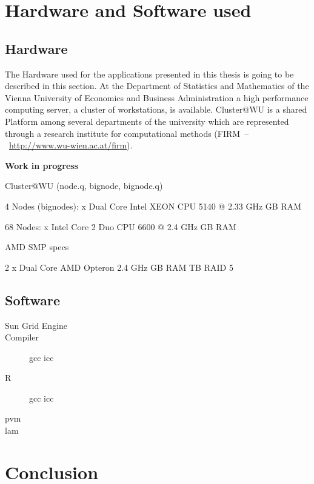 \section{Hardware and Software used}

\subsection{Hardware}
The Hardware used for the applications presented in this thesis is
going to be described in this section.
At the Department of Statistics and Mathematics of the Vienna
University of Economics and Business Administration a high performance
computing server, a cluster of workstations, is
available. Cluster@WU is a shared Platform among several departments
of the university which are represented through a research institute
for computational methods (FIRM~--~\url{http://www.wu-wien.ac.at/firm}). 

\textbf{Work in progress }


Cluster@WU (node.q, bignode, bignode.q)\newline

4 Nodes (bignodes): x Dual Core Intel XEON CPU 5140 @ 2.33 GHz GB RAM\newline


68 Nodes: x Intel Core 2 Duo CPU 6600 @ 2.4 GHz GB RAM\newline


AMD SMP specs\newline

2 x Dual Core AMD Opteron 2.4 GHz GB RAM TB RAID 5\newline


\subsection{Software}

\begin{description}
\item[Sun Grid Engine]
\item[Compiler] gcc icc
\item[R] gcc icc
\item[pvm]
\item[lam]
\end{description}

\section{Conclusion}
